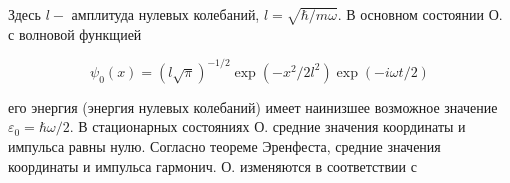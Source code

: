\documentclass[10pt]{article}
\begin{document}
Здесь $l-$ амплитуда нулевых колебаний, $l=\sqrt{\hbar / m \omega}$. В основном состоянии О. с волновой функщией



\[

\psi_{0}(x)=(l \sqrt{\pi})^{-1 / 2} \exp \left(-x^{2} / 2 l^{2}\right) \exp (-i \omega t / 2)

\]



его энергия (энергия нулевых колебаний) имеет наинизшее возможное значение $\varepsilon_{0}=\hbar \omega / 2$. В стационарных состояниях О. средние значения координаты и импульса равны нулю. Согласно теореме Эренфеста, средние значения координаты и импульса гармонич. О. изменяются в соответствии с
\end{document}
